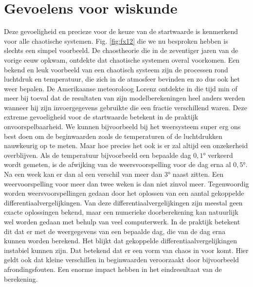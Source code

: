 \documentclass[11pt,fleqn]{book} %
\begin{document}
\section{Gevoelens voor wiskunde}
Deze gevoeligheid en precieze voor de keuze van de startwaarde is kenmerkend voor alle chaotische systemen. Fig. \ref{fig:fx12} die we nu besproken hebben is slechts een simpel voorbeeld. De chaostheorie die in de zeventiger jaren van de vorige eeuw opkwam, ontdekte dat chaotische systemen overal voorkomen. Een bekend en leuk voorbeeld van een chaotisch systeem zijn de processen rond luchtdruk en temperatuur, die zich in de atmosfeer bevinden en zo dus ook het weer bepalen. De Amerikaanse meteoroloog Lorenz ontdekte in die tijd min of meer bij toeval dat de resultaten van zijn modelberekeningen heel anders werden wanneer hij  zijn invoergegevens gebruikte die een fractie verschillend waren. Deze extreme gevoeligheid voor de startwaarde betekent in de praktijk onvoorspelbaarheid. We kunnen bijvoorbeeld bij het weersysteem super erg ons best doen om de beginwaarden zoals de temperaturen of de luchtdrukken nauwkeurig op te meten. Maar hoe precies het ook is er zal altijd een onzekerheid overblijven. Als de temperatuur bijvoorbeeld een bepaalde dag $0,1\si{\degree}$ verkeerd wordt gemeten, is de afwijking van de weersvoorspelling voor de dag erna al $0,5\si{\degree}$. Na een week kan er dan al een verschil van meer dan $3\si{\degree}$ naast zitten. Een weervoorspelling voor meer dan twee weken is dan niet zinvol meer. Tegenwoordig worden weersvoorspellingen gedaan door het oplossen van een aantal gekoppelde differentiaalvergelijkingen. Van deze differentiaalvergelijkingen zijn meestal geen exacte oplossingen bekend, maar een numerieke doorberekening kan natuurlijk wel worden gedaan met behulp van veel computerwerk. In de praktijk betekent dit dat er met de weergegevens van een bepaalde dag, die van de dag erna kunnen worden berekend. Het blijkt dat gekoppelde differentiaalvergelijkingen instabiel kunnen zijn. Dat betekend dat er een vorm van chaos in voor komt. Hier geldt ook dat kleine verschillen in beginwaarden veroorzaakt door bijvoorbeeld afrondingsfouten. Een enorme impact hebben in het eindresultaat van de berekening.
\end{document}
